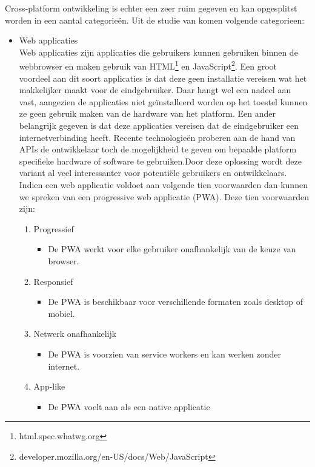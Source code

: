 Cross-platform ontwikkeling is echter een zeer ruim gegeven en kan opgesplitst worden in een aantal categorieën. Uit de studie van \textcite{Xanthopoulos2013} komen volgende categorieen:
\begin{itemize}
    \item Web applicaties\\
    Web applicaties zijn applicaties die gebruikers kunnen gebruiken binnen de webbrowser en maken gebruik van HTML\footnote{html.spec.whatwg.org} en JavaScript\footnote{developer.mozilla.org/en-US/docs/Web/JavaScript}. Een groot voordeel aan dit soort applicaties is dat deze geen installatie vereisen wat het makkelijker maakt voor de eindgebruiker. Daar hangt wel een nadeel aan vast, aangezien de applicaties niet geïnstalleerd worden op het toestel kunnen ze geen gebruik maken van de hardware van het platform. Een ander belangrijk gegeven is dat deze applicaties vereisen dat de eindgebruiker een internetverbinding heeft. Recente technologieën proberen aan de hand van APIs de ontwikkelaar toch de mogelijkheid te geven om bepaalde platform specifieke hardware of software te gebruiken.Door deze oplossing wordt deze variant al veel interessanter voor potentiële gebruikers en ontwikkelaars. Indien een web applicatie voldoet aan volgende tien voorwaarden \autocite{Osmani2015} dan kunnen we spreken van een progressive web applicatie (PWA). Deze tien voorwaarden zijn: 
    \begin{enumerate}
       \item Progressief
       \begin{itemize}
           \item De PWA werkt voor elke gebruiker onafhankelijk van de keuze van browser.
       \end{itemize}
       \item Responsief
       \begin{itemize}
           \item De PWA is beschikbaar voor verschillende formaten zoals desktop of mobiel.
       \end{itemize}
       \item Netwerk onafhankelijk
       \begin{itemize}
           \item De PWA is voorzien van service workers en kan werken zonder internet.
       \end{itemize}
       \item App-like
       \begin{itemize}
           \item De PWA voelt aan als een native applicatie

\end{itemize}
\end{enumerate}
\end{itemize}
